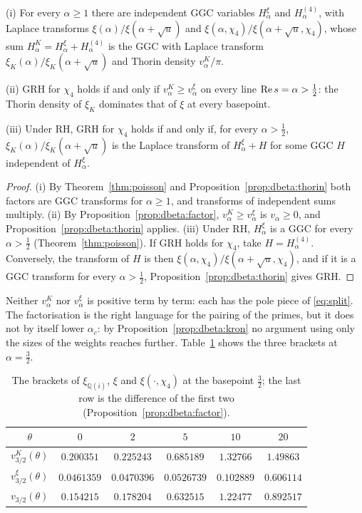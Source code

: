 \begin{corollary}\label{cor:dbeta:dom}
\textup{(i)} For every $\alpha\ge1$ there are independent GGC variables $H^\xi_\alpha$ and $H^{(4)}_\alpha$, with Laplace transforms $\xi(\alpha)/\xi(\alpha+\sqrt u)$ and $\xi(\alpha,\chi_4)/\xi(\alpha+\sqrt u,\chi_4)$, whose sum $H^K_\alpha=H^\xi_\alpha+H^{(4)}_\alpha$ is the GGC with Laplace transform $\xi_K(\alpha)/\xi_K(\alpha+\sqrt u)$ and Thorin density $v^K_\alpha/\pi$.

\textup{(ii)} GRH for $\chi_4$ holds if and only if $v^K_\alpha\ge v^\xi_\alpha$ on every line $\operatorname{Re} s=\alpha>\frac12$: the Thorin density of $\xi_K$ dominates that of $\xi$ at every basepoint.

\textup{(iii)} Under RH, GRH for $\chi_4$ holds if and only if, for every $\alpha>\frac12$, $\xi_K(\alpha)/\xi_K(\alpha+\sqrt u)$ is the Laplace transform of $H^\xi_\alpha+H$ for some GGC $H$ independent of $H^\xi_\alpha$.
\end{corollary}

\begin{proof}
(i) By Theorem~\ref{thm:poisson} and Proposition~\ref{prop:dbeta:thorin} both factors are GGC transforms for $\alpha\ge1$, and transforms of independent sums multiply. (ii) By Proposition~\ref{prop:dbeta:factor}, $v^K_\alpha\ge v^\xi_\alpha$ is $v_\alpha\ge0$, and Proposition~\ref{prop:dbeta:thorin} applies. (iii) Under RH, $H^\xi_\alpha$ is a GGC for every $\alpha>\frac12$ (Theorem~\ref{thm:poisson}). If GRH holds for $\chi_4$, take $H=H^{(4)}_\alpha$. Conversely, the transform of $H$ is then $\xi(\alpha,\chi_4)/\xi(\alpha+\sqrt u,\chi_4)$, and if it is a GGC transform for every $\alpha>\frac12$, Proposition~\ref{prop:dbeta:thorin} gives GRH.
\end{proof}

Neither $v^K_\alpha$ nor $v^\xi_\alpha$ is positive term by term: each has the pole piece of \eqref{eq:split}. The factorisation is the right language for the pairing of the primes, but it does not by itself lower $\alpha_c$: by Proposition~\ref{prop:dbeta:kron} no argument using only the sizes of the weights reaches further. Table~\ref{tab:dbeta:qi} shows the three brackets at $\alpha=\frac32$.

\begin{table}[htbp]
\centering\small
\begin{tabular}{cccccc}
\toprule
$\theta$ & $0$ & $2$ & $5$ & $10$ & $20$\\
\midrule
$v^K_{3/2}(\theta)$ & $0.200351$ & $0.225243$ & $0.685189$ & $1.32766$ & $1.49863$\\
$v^\xi_{3/2}(\theta)$ & $0.0461359$ & $0.0470396$ & $0.0526739$ & $0.102889$ & $0.606114$\\
$v_{3/2}(\theta)$ & $0.154215$ & $0.178204$ & $0.632515$ & $1.22477$ & $0.892517$\\
\bottomrule
\end{tabular}
\caption{The brackets of $\xi_{\mathbb Q(i)}$, $\xi$ and $\xi(\cdot,\chi_4)$ at the basepoint $\frac32$; the last row is the difference of the first two (Proposition~\ref{prop:dbeta:factor}).}
\label{tab:dbeta:qi}
\end{table}


